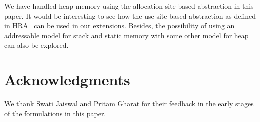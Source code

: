 \documentclass[a4paper,11pt,fleqn]{article}
\begin{document}
We have handled heap memory using the allocation site
based abstraction in this paper. It would be interesting
to see how the use-site based abstraction as defined in
HRA~\cite{Khedker.UP.Sanyal.A.Karkare.A:2007:Heap-reference-analysis}
can be used in our extensions. Besides, the possibility of 
using an addressable model for stack and static memory with some
other model for heap can also be explored.

\section*{Acknowledgments}

We thank Swati Jaiswal and Pritam Gharat for their feedback in the early stages of the formulations in this paper.


\end{document}
